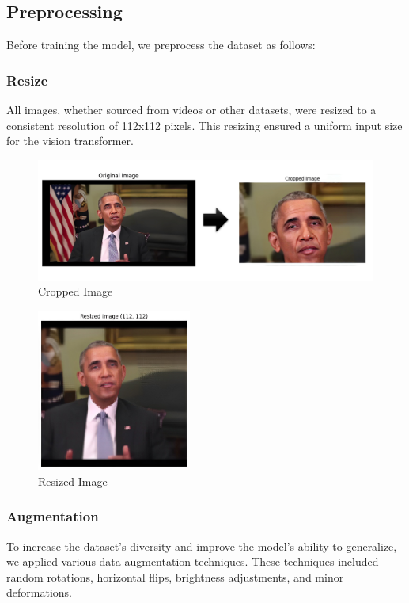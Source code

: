 \subsection{Preprocessing}

Before training the model, we preprocess the dataset as follows:

\subsubsection{Resize}
All images, whether sourced from videos or other datasets, were resized to a consistent resolution of 112x112 pixels. This resizing ensured a uniform input size for the vision transformer.

\begin{figure}[ht]
    \centering
    \includegraphics[width=5in]{img/cropped.jpg}
    \caption{Cropped Image}
    \label{fig:cropped}
\end{figure}

\begin{figure}[ht]
    \centering
    \includegraphics[width=2in]{img/resized.jpg}
    \caption{Resized Image}
    \label{fig:resized}
\end{figure}

\subsubsection{Augmentation} To increase the dataset's diversity and improve the model's ability to generalize, we applied various data augmentation techniques. These techniques included random rotations, horizontal flips, brightness adjustments, and minor deformations.
\newpage
